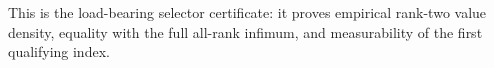This is the load-bearing selector certificate: it proves empirical rank-two value density, equality with the full all-rank infimum, and measurability of the first qualifying index.